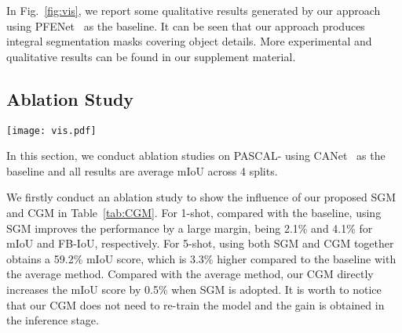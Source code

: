 \documentclass[final]{cvpr}
\begin{document}
In Fig.~\ref{fig:vis}, we report some qualitative results generated by our approach using PFENet~\cite{tian2020prior} as the baseline. It can be seen that our approach produces integral segmentation masks covering object details. More experimental and qualitative results can be found in our supplement material.

\subsection{Ablation Study}
\begin{figure*}
	\centering
	\texttt{[image: vis.pdf]}
	\caption{Qualitative results of our approach on Pascal-5. (a) Support images for the 1-shot task and their masks. (b) Query images and their ground-truth. (c) PFENet~\cite{tian2020prior} 1-shot results. (d) \emph{Ours-SCL} (PFENet) 1-shot results. (e) \emph{Ours-SCL} (PFENet) 5-shot results.}
	\label{fig:vis}
\end{figure*}

\begin{table}[t]
	\centering
	\caption{Ablation study of our proposed SGM and CGM on PASCAL- for both 1-shot and 5-shot segmentation. ``Avg." means we use the average score of predictions from multiple support images. ``base." means the baseline, which only uses the initial support vector without .}\label{tab:CGM}
	\resizebox{0.9\columnwidth}{!}{}
\end{table}

In this section, we conduct ablation studies on PASCAL- using CANet~\cite{zhang2019canet} as the baseline and all results are average mIoU across 4 splits. 

We firstly conduct an ablation study to show the influence of our proposed SGM and CGM in Table~\ref{tab:CGM}. For 1-shot, compared with the baseline, using SGM improves the performance by a large margin, being 2.1\%  and 4.1\% for mIoU and FB-IoU, respectively. For 5-shot, using both SGM and CGM together obtains a 59.2\% mIoU score, which is 3.3\% higher compared to the baseline with the average method. Compared with the average method, our CGM directly increases the mIoU score by 0.5\% when SGM is adopted. It is worth to notice that our CGM does not need to re-train the model and the gain is obtained in the inference stage. 
\end{document}
